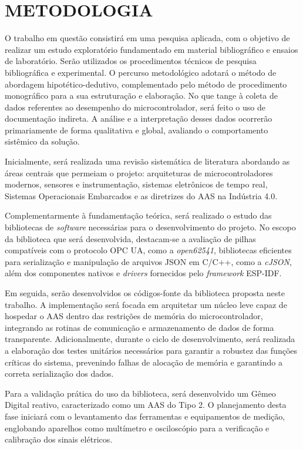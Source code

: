 \chapter{METODOLOGIA}

O trabalho em questão consistirá em uma pesquisa aplicada, com o objetivo de realizar um estudo exploratório fundamentado em material bibliográfico e ensaios de laboratório. Serão utilizados os procedimentos técnicos de pesquisa bibliográfica e experimental. O percurso metodológico adotará o método de abordagem hipotético-dedutivo, complementado pelo método de procedimento monográfico para a sua estruturação e elaboração. No que tange à coleta de dados referentes ao desempenho do microcontrolador, será feito o uso de documentação indireta. A análise e a interpretação desses dados ocorrerão primariamente de forma qualitativa e global, avaliando o comportamento sistêmico da solução.

Inicialmente, será realizada uma revisão sistemática de literatura abordando as áreas centrais que permeiam o projeto: arquiteturas de microcontroladores modernos, sensores e instrumentação, sistemas eletrônicos de tempo real, Sistemas Operacionais Embarcados e as diretrizes do AAS na Indústria 4.0.

Complementarmente à fundamentação teórica, será realizado o estudo das bibliotecas de \textit{software} necessárias para o desenvolvimento do projeto. No escopo da biblioteca que será desenvolvida, destacam-se a avaliação de pilhas compatíveis com o protocolo OPC UA, como a \textit{open62541}, bibliotecas eficientes para serialização e manipulação de arquivos JSON em C/C++, como a \textit{cJSON}, além dos componentes nativos e \textit{drivers} fornecidos pelo \textit{framework} ESP-IDF.

Em seguida, serão desenvolvidos os códigos-fonte da biblioteca proposta neste trabalho. A implementação será focada em arquitetar um núcleo leve capaz de hospedar o AAS dentro das restrições de memória do microcontrolador, integrando as rotinas de comunicação e armazenamento de dados de forma transparente. Adicionalmente, durante o ciclo de desenvolvimento, será realizada a elaboração dos testes unitários necessários para garantir a robustez das funções críticas do sistema, prevenindo falhas de alocação de memória e garantindo a correta serialização dos dados.

Para a validação prática do uso da biblioteca, será desenvolvido um Gêmeo Digital reativo, caracterizado como um AAS do Tipo 2. O planejamento desta fase iniciará com o levantamento das ferramentas e equipamentos de medição, englobando aparelhos como multímetro e osciloscópio para a verificação e calibração dos sinais elétricos.

